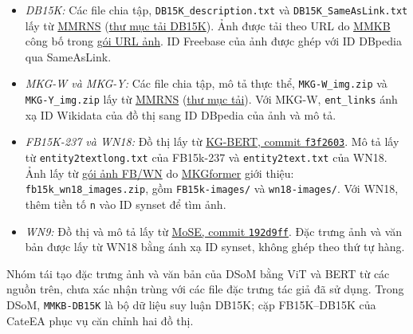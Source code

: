 \begin{itemize}
    \item \textit{DB15K:} Các file chia tập,
    \texttt{DB15K\_description.txt} và
    \texttt{DB15K\_SameAsLink.txt} lấy từ
    \href{https://github.com/quqxui/MMRNS}{MMRNS}
    (\href{https://drive.google.com/drive/folders/1eWW4QquPkZU2hEVONkJfLGpsBY_IpwR7}{thư mục tải DB15K}).
    Ảnh được tải theo URL do
    \href{https://github.com/mniepert/mmkb/tree/dc1c89cac110ddbb9944d6ed5ab2b3c2339d320c}{MMKB}
    công bố trong
    \href{https://www.dropbox.com/s/thct96phmypkaon/image-graph_urls.tar.gz}{gói URL ảnh}.
    ID Freebase của ảnh được ghép với ID DBpedia qua
    SameAsLink.

    \item \textit{MKG-W và MKG-Y:} Các file chia tập, mô tả
    thực thể, \texttt{MKG-W\_img.zip} và
    \texttt{MKG-Y\_img.zip} lấy từ
    \href{https://github.com/quqxui/MMRNS}{MMRNS}
    (\href{https://drive.google.com/drive/folders/1sFC-P9RKnikqNXjmLcj0IX7x5zvRs-Yj}{thư mục tải}).
    Với MKG-W, \texttt{ent\_links} ánh xạ ID Wikidata của đồ
    thị sang ID DBpedia của ảnh và mô tả.

    \item \textit{FB15K-237 và WN18:} Đồ thị lấy từ \href{https://github.com/yao8839836/kg-bert/tree/f3f260309c5e2986467a66e0e68fa7f53b1a150e/data}{KG-BERT,
    commit \texttt{f3f2603}}. Mô tả lấy từ
    \texttt{entity2textlong.txt} của FB15k-237 và
    \texttt{entity2text.txt} của WN18. Ảnh lấy từ
    \href{https://drive.google.com/file/d/197c4fCLVC6F7sCBqZIDwm5tjWeGJnZ5-/view}{gói ảnh FB/WN}
    do \href{https://github.com/zjunlp/MKGformer}{MKGformer}
    giới thiệu: \texttt{fb15k\_wn18\_images.zip}, gồm
    \texttt{FB15k-images/} và \texttt{wn18-images/}.
    Với WN18, thêm tiền tố \texttt{n} vào ID synset để tìm ảnh.

    \item \textit{WN9:} Đồ thị và mô tả lấy từ
    \href{https://github.com/OreOZhao/MoSE4MKGC/tree/192d9ff2882b5be6ef8239a37cbd90c5dd102b5a/src_data/WN9}{MoSE,
    commit \texttt{192d9ff}}. Đặc trưng ảnh và văn bản được
    lấy từ WN18 bằng ánh xạ ID synset, không ghép theo thứ tự
    hàng.
\end{itemize}

Nhóm tái tạo đặc trưng ảnh và văn bản của DSoM bằng ViT và
BERT từ các nguồn trên, chưa xác nhận trùng với các file
đặc trưng tác giả đã sử dụng. Trong DSoM, \texttt{MMKB-DB15K} là bộ dữ liệu suy luận DB15K;
cặp FB15K--DB15K của CateEA phục vụ căn chỉnh hai đồ thị.
